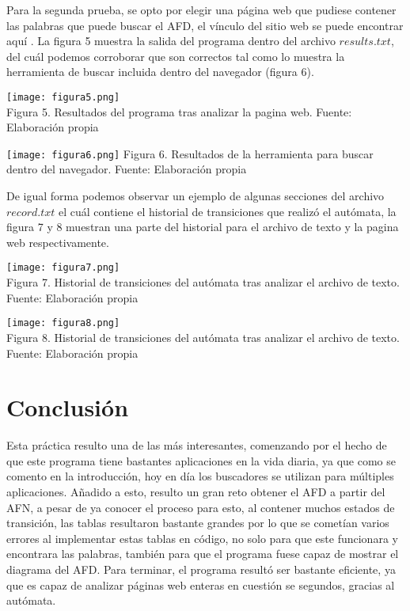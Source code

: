 \documentclass{article}
\begin{document}
	Para la segunda prueba, se opto por elegir una página web que pudiese contener las palabras que puede buscar el AFD, el vínculo del sitio web se puede encontrar aquí \cite{weblink}.
	La figura 5 muestra la salida del programa dentro del archivo $results.txt$, del cuál podemos corroborar que son correctos tal como lo muestra la herramienta de buscar incluida dentro del navegador (figura 6).
	
	\begin{center}
		\texttt{[image: figura5.png]}
		\small \\Figura 5. Resultados del programa tras analizar la pagina web. Fuente: Elaboración propia
	\end{center}
	
	\begin{center}
		\texttt{[image: figura6.png]}
		\small Figura 6. Resultados de la herramienta para buscar dentro del navegador. Fuente: Elaboración propia
	\end{center}
	
	De igual forma podemos observar un ejemplo de algunas secciones del archivo $record.txt$ el cuál contiene el historial de transiciones que realizó el autómata, la figura 7 y 8 muestran una parte del historial para el archivo de texto y la pagina web respectivamente.
	
	\begin{center}
		\texttt{[image: figura7.png]}
		\small \\Figura 7. Historial de transiciones del autómata tras analizar el archivo de texto. Fuente: Elaboración propia
	\end{center}
	
	\begin{center}
		\texttt{[image: figura8.png]}
		\small \\Figura 8. Historial de transiciones del autómata tras analizar el archivo de texto. Fuente: Elaboración propia
	\end{center}
	
	\section{Conclusión}
	
	Esta práctica resulto una de las más interesantes, comenzando por el hecho de que este programa tiene bastantes aplicaciones en la vida diaria, ya que como se comento en la introducción, hoy en día los buscadores se utilizan para múltiples aplicaciones. Añadido a esto, resulto un gran reto obtener el AFD a partir del AFN, a pesar de ya conocer el proceso para esto, al contener muchos estados de transición, las tablas resultaron bastante grandes por lo que se cometían varios errores al implementar estas tablas en código, no solo para que este funcionara y encontrara las palabras, también para que el programa fuese capaz de mostrar el diagrama del AFD. Para terminar, el programa resultó ser bastante eficiente, ya que es capaz de analizar páginas web enteras en cuestión se segundos, gracias al autómata.
	
	
	
\end{document}
